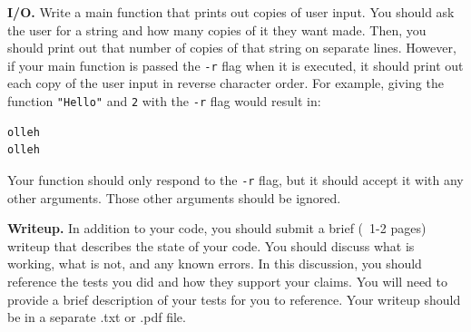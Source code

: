 \documentclass{exam}
\begin{document}
\begin{questions}

\question[5]
\textbf{I/O.}
Write a main function that prints out copies of user input. 
You should ask the user for a string and how many copies of it they want made. 
Then, you should print out that number of copies of that string on separate lines. 
However, if your main function is passed the \texttt{-r} flag when it is executed, it should print out each copy of the user input in reverse character order. 
For example, giving the function \texttt{"Hello"} and \texttt{2} with the \texttt{-r} flag would result in:
\begin{verbatim}
olleh
olleh
\end{verbatim}
Your function should only respond to the \texttt{-r} flag, but it should accept it with any other arguments. 
Those other arguments should be ignored. 

\question[10]
\textbf{Writeup.}
In addition to your code, you should submit a brief (~1-2 pages) writeup that describes the state of your code. 
You should discuss what is working, what is not, and any known errors. 
In this discussion, you should reference the tests you did and how they support your claims. 
You will need to provide a brief description of your tests for you to reference. 
Your writeup should be in a separate .txt or .pdf file. 

\end{questions}
\end{document}
